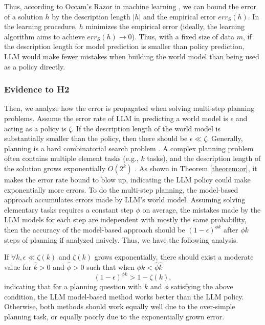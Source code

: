 Thus, according to Occam's Razor in machine learning \cite{shalev2014understanding}, we can bound the error of a solution $h$ by the description length $|h|$ and the empirical error $err_S(h)$. In the learning procedure, $h$ minimizes the empirical error (ideally, the learning algorithm aims to achieve $err_S(h)\rightarrow 0$). Thus, with a fixed size of data $m$, if the description length for model prediction is smaller than policy prediction, LLM would make fewer mistakes when building the world model than being used as a policy directly. 

\subsubsection{Evidence to H2}\label{sec:comp-error}

Then, we analyze how the error is propagated when solving multi-step planning problems. Assume the error rate of LLM in predicting a world model is $\epsilon$ and acting as a policy is $\zeta$. If the description length of the world model is substantially smaller than the policy, then there should be $\epsilon \ll \zeta$. Generally, planning is a hard combinatorial search problem \cite{kautz1996pushing}. A complex planning problem often contains multiple element tasks (e.g., $k$ tasks), and the description length of the solution grows exponentially $O(2^k)$ \cite{kautz1996pushing, weld1999recent}. As shown in Theorem \ref{theorem:or}, it makes the error rate bound to blow up, indicating the LLM policy could make exponentially more errors. To do the multi-step planning, the model-based approach accumulates errors made by LLM's world model. Assuming solving elementary tasks requires a constant step $\phi$ on average, the mistakes made by the LLM models for each step are independent with mostly the same probability, then the accuracy of the model-based approach should be $(1-\epsilon)^{\phi k}$ after $\phi k$ steps of planning if analyzed naively. 
 Thus, we have the following analysis. 
 \begin{proposition}[informal]
If $\forall k, \epsilon \ll \zeta(k)$ and $\zeta(k)$ grows exponentially, there should exist a moderate value for $\hat{k}>0$ and $\hat{\phi}>0$ such that when $\phi k < \hat{\phi} \hat{k}$
\begin{equation}
    (1-\epsilon)^{\phi k}> 1-\zeta(k),\label{eq:inq}
\end{equation}
indicating that for a planning question with $k$ and $\phi$ satisfying the above condition, the LLM model-based method works better than the LLM policy. Otherwise, both methods should work equally well due to the over-simple planning task, or equally poorly due to the exponentially grown error.  
 \end{proposition}\label{prop:lpolicyvsmodel}

